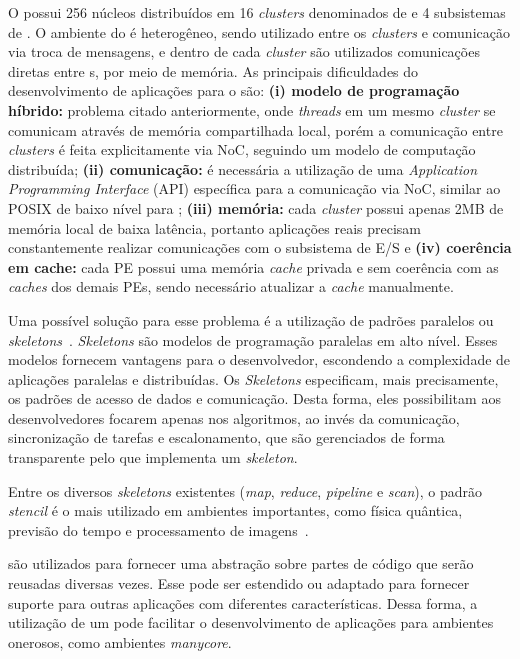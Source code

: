 O \mppa possui 256 núcleos distribuídos em 16 \textit{clusters} denominados de \pe e 4 subsistemas de \io. O ambiente do \mppa é heterogêneo, sendo utilizado entre os \textit{clusters} e \io comunicação via troca de mensagens, e dentro de cada \textit{cluster} são utilizados comunicações diretas entre \pe s, por meio de memória. As principais dificuldades do desenvolvimento de aplicações para o \mppa são: \textbf{(i) modelo de programação híbrido:} problema citado anteriormente, onde \textit{threads} em um mesmo \textit{cluster} se comunicam através de memória compartilhada local, porém a comunicação entre \textit{clusters} é feita explicitamente via NoC, seguindo um modelo de computação distribuída; \textbf{(ii) comunicação:} é necessária a utilização de uma \textit{Application Programming Interface} (API) específica para a comunicação via NoC, similar ao POSIX de baixo nível para \ipc; \textbf{(iii) memória:} cada \textit{cluster} possui apenas 2MB de memória local de baixa latência, portanto aplicações reais precisam constantemente realizar comunicações com o subsistema de E/S e \textbf{(iv) coerência em cache:} cada PE possui uma memória \textit{cache} privada e sem coerência com as \textit{caches} dos demais PEs, sendo necessário atualizar a \textit{cache} manualmente.

Uma possível solução para esse problema é a utilização de padrões paralelos ou \textit{skeletons}~\cite{cole-skeleton:2004}. \textit{Skeletons} são modelos de programação paralelas em alto nível. Esses modelos fornecem vantagens para o desenvolvedor, escondendo a complexidade de aplicações paralelas e distribuídas. Os \textit{Skeletons} especificam, mais precisamente, os padrões de acesso de dados e comunicação. Desta forma, eles possibilitam aos desenvolvedores focarem apenas nos algoritmos, ao invés da comunicação, sincronização de tarefas e escalonamento, que são gerenciados de forma transparente pelo \fw que implementa um \textit{skeleton}.

Entre os diversos \textit{skeletons} existentes (\textit{map}, \textit{reduce}, \textit{pipeline} e \textit{scan}), o padrão \textit{stencil} é o mais utilizado em ambientes importantes, como física quântica, previsão do tempo e processamento de imagens~\cite{gonzalez06,holewinski12}.


\Fws são utilizados para fornecer uma abstração sobre partes de código que serão reusadas diversas vezes. Esse \fw pode ser estendido ou adaptado para fornecer suporte para outras aplicações com diferentes características. Dessa forma, a utilização de um \fw pode facilitar o desenvolvimento de aplicações para ambientes onerosos, como ambientes \textit{manycore}.

